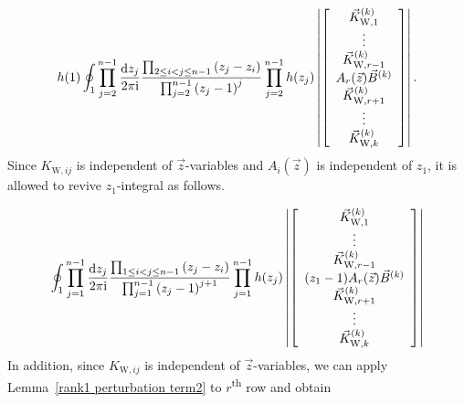 \documentclass[cmp]{svjour}
\numberwithin{theorem}{section}
\numberwithin{equation}{section}
\def\dd{{\rm d}}
\def\ii{{\rm i}}
\begin{document}
\begin{equation*}
h(1) \oint_{1} \prod_{j=2}^{n-1}{ \frac{\dd z_j}{2 \pi \ii} } \frac{ \prod_{2 \leq i < j \leq n-1}{(z_j - z_i)} }{ \prod_{j=2}^{n-1}{{(z_j -1)}^{j}}  } \prod_{j=2}^{n-1}{h(z_j)} 
\left|
\left[
\begin{array}{c}
\vec{K}^{(k)}_{\mathrm{W},1} \\
\vdots \\
\vec{K}^{(k)}_{\mathrm{W},r -1} \\
A_r(\vec{z}) \vec{B}^{(k)}  \\
\vec{K}^{(k)}_{\mathrm{W},r +1} \\
\vdots  \\
\vec{K}^{(k)}_{\mathrm{W}, k}
\end{array}
\right]
\right| .
\end{equation*} 
Since $K_{\mathrm{W},ij}$ is independent of $\vec{z}$-variables and $A_i(\vec{z})$ is independent of $z_1$, it is allowed to revive $z_1$-integral as follows.

\begin{equation*}
\oint_{1} \prod_{j=1}^{n-1}{ \frac{\dd z_j}{2 \pi \ii} } \frac{ \prod_{1 \leq i < j \leq n-1}{(z_j - z_i)} }{ \prod_{j=1}^{n-1}{{(z_j -1)}^{j+1}} } \prod_{j=1}^{n-1}{h(z_j)} 
 \left| 
 \left[
\begin{array}{c}
\vec{K}^{(k)}_{\mathrm{W}, 1} \\
\vdots  \\
\vec{K}^{(k)}_{\mathrm{W}, r-1} \\ 
 (z_1 - 1) A_r(\vec{z}) \vec{B}^{(k)}  \\
\vec{K}^{(k)}_{\mathrm{W}, r +1} \\  
\vdots  \\
\vec{K}^{(k)}_{\mathrm{W}, k}  
\end{array}
\right]
\right|
\end{equation*}
In addition, since $K_{\mathrm{W},ij}$ is independent of $\vec{z}$-variables, we can apply Lemma~\ref{rank1 perturbation term2} to $r$\textsuperscript{th} row and obtain 
\end{document}
